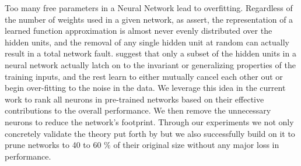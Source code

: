 Too many free parameters in a Neural Network lead to overfitting. Regardless of the number of weights used in a given network, as \cite{segee1991fault} assert, the representation of a learned function approximation is almost never evenly distributed over the hidden units, and the removal of any single hidden unit at random can actually result in a total network fault. \cite{mozer1989using} suggest that only a subset of the hidden units in a neural network actually latch on to the invariant or generalizing properties of the training inputs, and the rest learn to either mutually cancel each other out or begin over-fitting to the noise in the data. We leverage this idea in the current work to rank all neurons in pre-trained networks based on their effective contributions to the overall performance. We then remove the unnecessary neurons to reduce the network's footprint. Through our experiments we not only concretely validate the theory put forth by \cite{mozer1989using} but we also successfully build on  it to prune networks to 40 to 60 \% of their original size without any major loss in performance.
